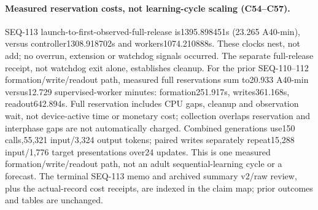 \documentclass{article}
\begin{document}
\paragraph{Measured reservation costs, not learning-cycle scaling (C54--C57).} SEQ-113 launch-to-first-observed-full-release is1395.898451s (23.265 A40-min), versus controller1308.918702s and workers1074.210888s. These clocks nest, not add; no overrun, extension or watchdog signals occurred. The separate full-release receipt, not watchdog exit alone, establishes cleanup. For the prior SEQ-110--112 formation/write/readout path, measured full reservations sum to20.933 A40-min versus12.729 supervised-worker minutes: formation251.917s, writes361.168s, readout642.894s. Full reservation includes CPU gaps, cleanup and observation wait, not device-active time or monetary cost; collection overlaps reservation and interphase gaps are not automatically charged. Combined generations use150 calls,55,321 input/3,324 output tokens; paired writes separately repeat15,288 input/1,776 target presentations over24 updates. This is one measured formation/write/readout path, not an adult sequential-learning cycle or a forecast. The terminal SEQ-113 memo and archived summary v2/raw review, plus the actual-record cost receipts, are indexed in the claim map; prior outcomes and tables are unchanged.
\end{document}
